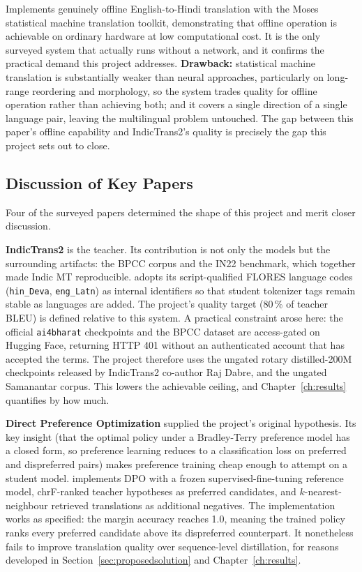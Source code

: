 Implements genuinely offline English-to-Hindi translation with the Moses
statistical machine translation toolkit, demonstrating that offline operation
is achievable on ordinary hardware at low computational cost. It is the only
surveyed system that actually runs without a network, and it confirms the
practical demand this project addresses. \textbf{Drawback:} statistical machine
translation is substantially weaker than neural approaches, particularly on
long-range reordering and morphology, so the system trades quality for
offline operation rather than achieving both; and it covers a single direction
of a single language pair, leaving the multilingual problem untouched. The gap
between this paper's offline capability and IndicTrans2's quality is precisely
the gap this project sets out to close.



\subsection{Discussion of Key Papers}
\label{subsec:keypapers}

Four of the surveyed papers determined the shape of this project and merit
closer discussion.

\textbf{IndicTrans2} \cite{ref:indictrans2} is the teacher. Its contribution is
not only the models but the surrounding artifacts: the BPCC corpus and the IN22
benchmark, which together made Indic MT reproducible. \setu{} adopts its
script-qualified FLORES language codes (\texttt{hin\_Deva}, \texttt{eng\_Latn})
as internal identifiers so that student tokenizer tags remain stable as
languages are added. The project's quality target (80\,\% of teacher BLEU) is
defined relative to this system. A practical constraint arose here: the official
\texttt{ai4bharat} checkpoints and the BPCC dataset are access-gated on Hugging
Face, returning HTTP 401 without an authenticated account that has accepted the
terms. The project therefore uses the ungated rotary distilled-200M checkpoints
released by IndicTrans2 co-author Raj Dabre, and the ungated Samanantar corpus.
This lowers the achievable ceiling, and Chapter~\ref{ch:results} quantifies by
how much.

\textbf{Direct Preference Optimization} \cite{ref:dpo} supplied the project's
original hypothesis. Its key insight (that the optimal policy under a
Bradley-Terry preference model has a closed form, so preference learning reduces
to a classification loss on preferred and dispreferred pairs) makes preference
training cheap enough to attempt on a student model. \setu{} implements DPO with
a frozen supervised-fine-tuning reference model, chrF-ranked teacher hypotheses
as preferred candidates, and $k$-nearest-neighbour retrieved translations as
additional negatives. The implementation works as specified: the margin accuracy
reaches 1.0, meaning the trained policy ranks every preferred candidate above
its dispreferred counterpart. It nonetheless fails to improve translation
quality over sequence-level distillation, for reasons developed in
Section~\ref{sec:proposedsolution} and Chapter~\ref{ch:results}.

